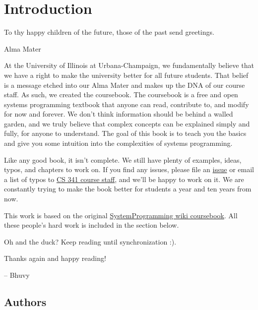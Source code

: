 \chapter{Introduction}

\epigraph{To thy happy children of the future, those of the past send greetings.}{Alma Mater}

At the University of Illinois at Urbana-Champaign, we fundamentally believe that we have a right to make the university better for all future students.
That belief is a message etched into our Alma Mater and makes up the DNA of our course staff.
As such, we created the coursebook.
The coursebook is a free and open systems programming textbook that anyone can read, contribute to, and modify for now and forever.
We don't think information should be behind a walled garden, and we truly believe that complex concepts can be explained simply and fully, for anyone to understand.
The goal of this book is to teach you the basics and give you some intuition into the complexities of systems programming.

Like any good book, it isn't complete.
We still have plenty of examples, ideas, typos, and chapters to work on.
If you find any issues, please file an \href{https://github.com/illinois-cs241/coursebook/issues}{issue} or email a list of typos to \href{https://cs341.cs.illinois.edu/staff}{CS 341 course staff}, and we'll be happy to work on it.
We are constantly trying to make the book better for students a year and ten years from now.

This work is based on the original \href{https://github.com/angrave/SystemProgramming/wiki}{SystemProgramming wiki coursebook}.
All these people's hard work is included in the section below.

Oh and the duck? Keep reading until synchronization :).

Thanks again and happy reading!

-- Bhuvy

\section{Authors}



